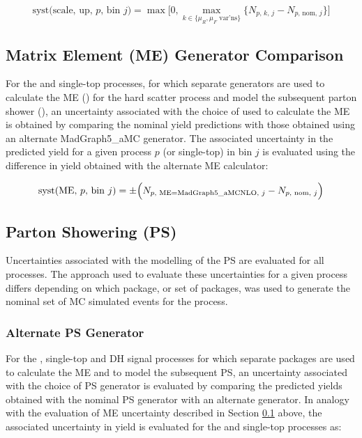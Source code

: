 \begin{equation}
\label{eq:scale_systs}
\text{syst}\text{(scale, up, \(p\), bin \(j\))} = \max\bigg[0, \max\limits_{k\in\{\mu_R, \mu_F \text{ var'ns}\}} \big\{N_\text{\(p\), \(k\), \(j\)} - N_\text{\(p\), nom, \(j\)}\big\} \bigg]
\end{equation}

\subsection{Matrix Element (ME) Generator Comparison}
\label{sec:ME_syst}

For the \ttbar and single-top processes, for which separate generators are used to calculate the ME (\POWHEGBOX) for the hard scatter process and model the subsequent parton shower (), an uncertainty associated with the choice of \POWHEGBOX used to calculate the ME is obtained by comparing the nominal yield predictions with those obtained using an alternate MadGraph5\_aMC\@NLO \cite{Alwall:2014hca} generator. The associated uncertainty in the predicted yield for a given process \(p\) (\ttbar or single-top) in bin \(j\) is evaluated using the difference in yield obtained with the alternate ME calculator:

\begin{equation}
\label{eq:ME_syst}
\text{syst}\text{(ME, \(p\), bin \(j\))}= \pm \Big(N_\text{\(p\), ME=MadGraph5\_aMC\@NLO, \(j\)} - N_\text{\(p\), nom, \(j\)}\Big)
\end{equation}

\subsection{Parton Showering (PS)}

Uncertainties associated with the modelling of the PS are evaluated for all processes. The approach used to evaluate these uncertainties for a given process differs depending on which package, or set of packages, was used to generate the nominal set of MC simulated events for the process.

\subsubsection{Alternate PS Generator}

For the \ttbar, single-top and DH signal processes for which separate packages are used to calculate the ME and to model the subsequent PS, an uncertainty associated with the choice of PS generator is evaluated by comparing the predicted yields obtained with the nominal  PS generator with an alternate \HERWIG[7] \cite{Bahr:2008pv,Bellm:2015jjp} generator. In analogy with the evaluation of ME uncertainty described in Section \ref{sec:ME_syst} above, the associated uncertainty in yield is evaluated for the \ttbar and single-top processes as:

